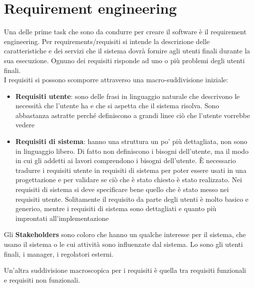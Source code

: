 \section{Requirement engineering}
\label{sec:04_requirement_engineering}
Una delle prime task che sono da condurre per creare il software è il requirement engineering.
Per requirements/requisiti si intende la descrizione delle caratteristiche e dei servizi che il sistema dovrà fornire agli utenti finali durante la sua esecuzione.
Ognuno dei requisiti risponde ad uno o più problemi degli utenti finali.\\
I requisiti si possono scomporre attraverso una macro-suddivisione iniziale:
\begin{itemize}[noitemsep]
    \item \textbf{Requisiti utente}: sono delle frasi in linguaggio naturale che descrivono le necessità che l'utente ha e che si aspetta che il sistema risolva. Sono abbastanza astratte perché definiscono a grandi linee ciò che l'utente vorrebbe vedere
    \item \textbf{Requisiti di sistema}: hanno una struttura un po' più dettagliata, non sono in linguaggio libero. Di fatto non definiscono i bisogni dell'utente, ma il modo in cui gli addetti ai lavori comprendono i bisogni dell'utente. È necessario tradurre i requisiti utente in requisiti di sistema per poter essere usati in una progettazione e per validare se ciò che è stato chiesto è stato realizzato. Nei requisiti di sistema si deve specificare bene quello che è stato messo nei requisiti utente. Solitamente il requisito da parte degli utenti è molto basico e generico, mentre i requisiti di sistema sono dettagliati e quanto più improntati all'implementazione
\end{itemize}
Gli \textbf{Stakeholders} sono coloro che hanno un qualche interesse per il sistema, che usano il sistema o le cui attività sono influenzate dal sistema. Lo sono gli utenti finali, i manager, i regolatori esterni.

Un'altra suddivisione macroscopica per i requisiti è quella tra requisiti funzionali e requisiti non funzionali.
